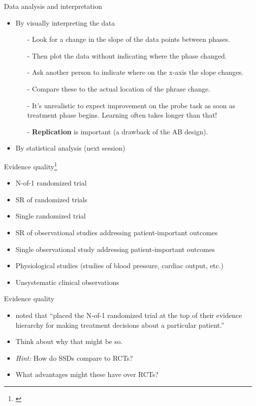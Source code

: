 \documentclass{beamer}
\begin{document}
% 
\begin{frame}{Data analysis and interpretation}
	\begin{itemize}
	\item By visually interpreting the data
		\begin{itemize}
		\item[-] Look for a change in the slope of the data points between phases.
		\item[-] Then plot the data without indicating where the phase changed.
		\item[-] Ask another person to indicate where on the x-axis the slope changes.
		\item[-] Compare these to the actual location of the phrase change. 
		\item[-] It's unrealistic to expect improvement on the probe task as soon as treatment phase begins. Learning often takes longer than that!
		\item[-] \textbf{Replication} is important (a drawback of the AB design).
		\end{itemize}
	\item By statistical analysis (next session)
	\end{itemize}
\end{frame}

% 
\begin{frame}{Evidence quality\footnote{\tiny{\citet{Guyatt2008d}}}}
	\begin{itemize}
	\item \alert{N-of-1 randomized trial}
	\item SR of randomized trials
	\item Single randomized trial
	\item SR of observational studies addressing patient-important outcomes
	\item Single observational study addressing patient-important outcomes 
	\item Physiological studies (studies of blood pressure, cardiac output, etc.)
	\item Unsystematic clinical observations
	\end{itemize}
\end{frame}

\begin{frame}{Evidence quality}
	\begin{itemize}	
	\item \citet[p. 40]{Dollaghan2007a} noted that \citet{Guyatt2000} ``placed the N-of-1 randomized trial at the top of their evidence hierarchy for making treatment decisions about a particular patient.''
	\item Think about why that might be so. 
	\item \emph{Hint:} How do SSDs compare to RCTs?
	\item What advantages might these have over RCTs?
	\end{itemize}
\end{frame}
\end{document}

